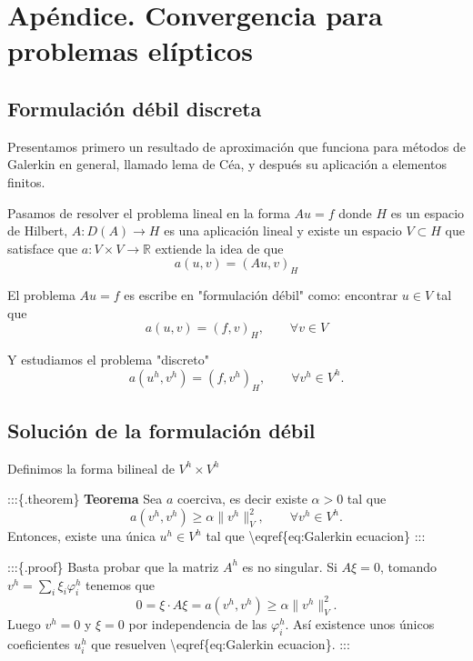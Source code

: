 \section{Apéndice. Convergencia para problemas
  elípticos}\label{apuxe9ndice-convergencia-para-problemas-eluxedpticos}

\subsection{Formulación débil discreta
}\label{formulaciuxf3n-duxe9bil-discreta-scrollable}

Presentamos primero un resultado de aproximación que funciona para
métodos de Galerkin en general, llamado lema de Céa, y después su
aplicación a elementos finitos.

Pasamos de resolver el problema lineal en la forma \(A u = f\) donde
\(H\) es un espacio de Hilbert, \(A : D(A) \to H\) es una aplicación
lineal y existe un espacio \(V \subset H\) que satisface que
\(a: V \times V \to \mathbb R\) extiende la idea de que \[
    a(u,v) =  ( A u , v )_H
\]

El problema \(Au = f\) es escribe en "formulación débil" como: encontrar
\(u \in V\) tal que \[
    \tag{P}
    \label{eq:Laplace ecuacion}
    a(u,v) = ( f , v )_H, \qquad \forall v \in V
\]

Y estudiamos el problema "discreto" \[
    \tag{P$_h$}
    \label{eq:Galerkin ecuacion}
    a(u^h, v^h) = (f , v^h)_H, \qquad \forall v^h \in V^h.
\]

\subsection{Solución de la formulación débil
}\label{soluciuxf3n-de-la-formulaciuxf3n-duxe9bil-scrollable}

Definimos la forma bilineal de \(V^h \times V^h\)

:::\{.theorem\} \textbf{Teorema} Sea \(a\) coerciva, es decir existe
\(\alpha  > 0\) tal que \[
    a(v^h, v^h) \ge \alpha \|v^h\|_V^2 , \qquad \forall v^h \in V^h.
\] Entonces, existe una única \(u^h \in V^h\) tal que
\textbackslash eqref\{eq:Galerkin ecuacion\} :::

:::\{.proof\} Basta probar que la matriz \(A^h\) es no singular. Si
\(A \xi = 0\), tomando \(v^h = \sum_i \xi_i \varphi^h_i\) tenemos que \[
    0 = \xi \cdot  A \xi = a(v^h, v^h ) \ge \alpha \|v^h \|_V^2.
\] Luego \(v^h = 0\) y \(\xi = 0\) por independencia de las
\(\varphi_i^h\). Así existence unos únicos coeficientes \(u^h_i\) que
resuelven \textbackslash eqref\{eq:Galerkin ecuacion\}. :::

